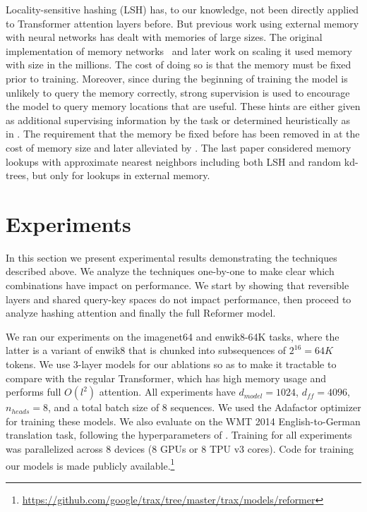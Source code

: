 Locality-sensitive hashing (LSH) has, to our knowledge, not been directly applied to Transformer attention layers before. But previous work using external memory with neural networks has dealt with memories of large sizes.  The original implementation of memory networks~\citep{mem_nets} and later work on scaling it \citep{large_mem_nets, hier_mem_nets} used memory with size in the millions.  The cost of doing so is that the memory must be fixed prior to training. Moreover, since during the beginning of training the model is unlikely to query the memory correctly, strong supervision is used to encourage the model to query memory locations that are useful. These hints are either given as additional supervising information by the  task or determined heuristically as in \citet{goldilocks}.
The requirement that the memory be fixed before has been removed in
\citet{santoro16} at the cost of memory size and later alleviated by \citet{jack_rae}. The last paper considered memory lookups with approximate nearest neighbors including both LSH and random kd-trees, but only for lookups in external memory.

\section{Experiments} \label{sec:exp}

In this section we present experimental results demonstrating the techniques described above. We analyze the techniques one-by-one to make clear which combinations have impact on performance. We start by showing that reversible layers and shared query-key spaces do not impact performance, then proceed to analyze hashing attention and finally the full Reformer model.

We ran our experiments on the imagenet64 and enwik8-64K tasks, where the latter is a variant of enwik8 that is chunked into subsequences of $2^{16} = 64K$ tokens. We use 3-layer models for our ablations so as to make it tractable to compare with the regular Transformer, which has high memory usage and performs full $O(l^2)$ attention. All experiments have $d_{model}=1024$, $d_{ff}=4096$, $n_{heads}=8$, and a total batch size of 8 sequences. We used the Adafactor optimizer \citep{adafactor} for training these models. We also evaluate on the WMT 2014 English-to-German translation task, following the hyperparameters of \citet{transformer}. Training for all experiments was parallelized across 8 devices (8 GPUs or 8 TPU v3 cores). Code for training our models is made publicly available.\footnote{\url{https://github.com/google/trax/tree/master/trax/models/reformer}}

